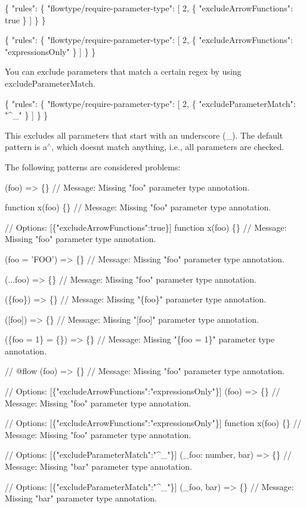 \begin{DoxyCode}
\{
    "rules": \{
        "flowtype/require-parameter-type": [
            2,
            \{
              "excludeArrowFunctions": true
            \}
        ]
    \}
\}

\{
    "rules": \{
        "flowtype/require-parameter-type": [
            2,
            \{
              "excludeArrowFunctions": "expressionsOnly"
            \}
        ]
    \}
\}
\end{DoxyCode}


You can exclude parameters that match a certain regex by using {\ttfamily exclude\+Parameter\+Match}.


\begin{DoxyCode}
\{
    "rules": \{
        "flowtype/require-parameter-type": [
            2,
            \{
              "excludeParameterMatch": "^\_"
            \}
        ]
    \}
\}
\end{DoxyCode}


This excludes all parameters that start with an underscore ({\ttfamily \+\_\+}). The default pattern is {\ttfamily a$^\wedge$}, which doesn\textquotesingle{}t match anything, i.\+e., all parameters are checked.

The following patterns are considered problems\+:


\begin{DoxyCode}
(foo) => \{\}
// Message: Missing "foo" parameter type annotation.

function x(foo) \{\}
// Message: Missing "foo" parameter type annotation.

// Options: [\{"excludeArrowFunctions":true\}]
function x(foo) \{\}
// Message: Missing "foo" parameter type annotation.

(foo = 'FOO') => \{\}
// Message: Missing "foo" parameter type annotation.

(...foo) => \{\}
// Message: Missing "foo" parameter type annotation.

(\{foo\}) => \{\}
// Message: Missing "\{foo\}" parameter type annotation.

([foo]) => \{\}
// Message: Missing "[foo]" parameter type annotation.

(\{foo = 1\} = \{\}) => \{\}
// Message: Missing "\{foo = 1\}" parameter type annotation.

// @flow
(foo) => \{\}
// Message: Missing "foo" parameter type annotation.

// Options: [\{"excludeArrowFunctions":"expressionsOnly"\}]
(foo) => \{\}
// Message: Missing "foo" parameter type annotation.

// Options: [\{"excludeArrowFunctions":"expressionsOnly"\}]
function x(foo) \{\}
// Message: Missing "foo" parameter type annotation.

// Options: [\{"excludeParameterMatch":"^\_"\}]
(\_foo: number, bar) => \{\}
// Message: Missing "bar" parameter type annotation.

// Options: [\{"excludeParameterMatch":"^\_"\}]
(\_foo, bar) => \{\}
// Message: Missing "bar" parameter type annotation.
\end{DoxyCode}


